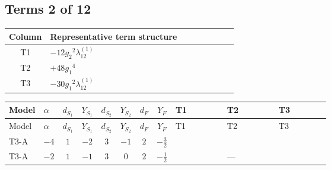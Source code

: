 \documentclass[8pt]{article}
\begin{document}
\begin{landscape}
\subsection*{Terms 2 of 12}
\begin{center}
\begin{tabular}{@{}c >{\raggedright\arraybackslash}p{0.82\linewidth}@{}}
\toprule
Column & Representative term structure \\
\midrule
T1 & \(\displaystyle -12 {g_2}^2 {\lambda_{12}^{(1)}}\) \\
\midrule
T2 & \(\displaystyle +48 {g_1}^4\) \\
\midrule
T3 & \(\displaystyle -30 {g_1}^2 {\lambda_{12}^{(1)}}\) \\
\midrule
\bottomrule
\end{tabular}
\end{center}
\smallskip
\tiny
\begin{longtable}{@{}llcccccc >{\raggedright\arraybackslash}p{0.21\linewidth} >{\raggedright\arraybackslash}p{0.21\linewidth} >{\raggedright\arraybackslash}p{0.21\linewidth}@{}}
\toprule
Model & $\alpha$ & $d_{S_1}$ & $Y_{S_1}$ & $d_{S_2}$ & $Y_{S_2}$ & $d_F$ & $Y_F$ & T1 & T2 & T3 \\
\midrule
\endfirsthead
\toprule
Model & $\alpha$ & $d_{S_1}$ & $Y_{S_1}$ & $d_{S_2}$ & $Y_{S_2}$ & $d_F$ & $Y_F$ & T1 & T2 & T3 \\
\midrule
\endhead
T3-A & $-4$ & $1$ & $-2$ & $3$ & $-1$ & $2$ & $-\frac{3}{2}$ & \scriptsize\adjustbox{max width=\linewidth}{$\begin{gathered} -12 {g_2}^2 {\lambda_{12}^{(1)}}\end{gathered}$} & \scriptsize\adjustbox{max width=\linewidth}{$\begin{gathered} +48 {g_1}^4\end{gathered}$} & \scriptsize\adjustbox{max width=\linewidth}{$\begin{gathered} -30 {g_1}^2 {\lambda_{12}^{(1)}}\end{gathered}$} \\
\midrule
T3-A & $-2$ & $1$ & $-1$ & $3$ & $0$ & $2$ & $-\frac{1}{2}$ & \scriptsize\adjustbox{max width=\linewidth}{$\begin{gathered} -12 {g_2}^2 {\lambda_{12}^{(1)}}\end{gathered}$} & --- & \scriptsize\adjustbox{max width=\linewidth}{$\begin{gathered} -6 {g_1}^2 {\lambda_{12}^{(1)}}\end{gathered}$} \\

\end{longtable}
\end{landscape}
\end{document}
